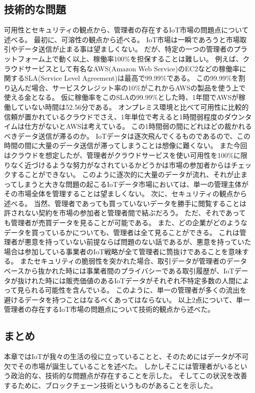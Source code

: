 \subsection{技術的な問題}
可用性とセキュリティの観点から、管理者の存在するIoT市場の問題点について述べる。
最初に、可溶性の観点から述べる。
IoT市場は一瞬であろうと市場取引やデータ送信が止まる事は望ましくない。
だが、特定の一つの管理者のプラットフォーム上で動く以上、稼働率100\%を担保することは難しい。
例えば、クラウドサービスとして有名なAWS(Amazon Web Service)のEC2などの稼働率に関するSLA(Service Level Agreement)は最高で99.99\%である。
この99.99\%を割り込んだ場合、サービスクレジット率の10\%がこれからAWSの製品を使う上で使える金となる。
仮に稼働率をこのSLAの99.99\%とした時、1年間でAWSが稼働していない時間は52.56分である。
オンプレミス環境と比べて可用性に比較的信頼が置かれているクラウドでさえ、1年単位で考えると1時間弱程度のダウンタイムは仕方がないとAWSは考えている。
この1時間弱の間にどれほどの裁かれるべきデータ送信が滞るのか。
IoTデータは逐次飛んでくるものであるので、この時間の間に大量のデータ送信が滞ってしまうことは想像に難くない。
また今回はクラウドを想定したが、管理者がクラウドサービスを使い可用性を100\%に限りなく近づけるような努力がなされているかどうかは市場の参加者からはチェックすることができない。
このように逐次的に大量のデータが流れ、それが止まってしまうと大きな問題の起こるIoTデータ市場においては、単一の管理主体がその市場全体を管理することは望ましくない。
次に、セキュリティの観点から述べる。
当然、管理者であっても買っていないデータを勝手に閲覧することは許されない契約を市場の参加者と管理者間で結ぶだろう。
ただ、それであっても管理者が売買データを見ることが可能である。
また、どの企業がどのようなデータを買っているかについても、管理者は全て見ることができる。
これは管理者が悪意を持っていない前提ならば問題のない話であるが、悪意を持っていた場合は参加している事業者のIoT戦略が全て管理者に筒抜けであることを意味する。
またセキュリティの脆弱性を突かれた場合、取引データが管理者のデータベースから抜かれた時には事業者間のプライバシーである取引履歴が、IoTデータが抜けれた時には販売価値のあるIoTデータがそれぞれ不特定多数の人間によって見られる可能性を含んでいる。
このように、単一の管理者が多くの流出を避けるデータを持つことはなるべくあってはならない。
以上2点について、単一管理者の存在するIoT市場の問題点について技術的観点から述べた。

\subsection{まとめ}
本章ではIoTが我々の生活の役に立っていることと、そのためにはデータが不可欠でその市場が誕生していることを述べた。
しかしそこには管理者がいるという政治的な、技術的な問題点が存在することを示した。
そしてこの状況を改善するために、ブロックチェーン技術というものがあることを示した。